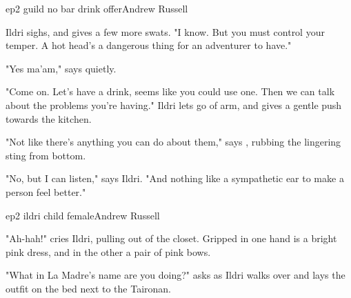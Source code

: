 \documentclass{book}
\begin{document}
\begin{childnode}{ep2 guild no bar drink offer}{Andrew Russell}


    Ildri sighs, and gives \name{} a few more swats. "I know. But you must control your temper. A hot head's a dangerous thing for an adventurer to have."

    "Yes ma'am," says \name{} quietly.

    "Come on. Let's have a drink, seems like you could use one. Then we can talk about the problems you're having." Ildri lets go of \names{} arm, and gives \himher{} a gentle push towards the kitchen. 

    "Not like there's anything you can do about them," says \name{}, rubbing the lingering sting from \hisher{} bottom.

    "No, but I can listen," says Ildri. "And nothing like a sympathetic ear to make a person feel better."



\end{childnode}

\begin{childnode}{ep2 ildri child female}{Andrew Russell}

    "Ah-hah!" cries Ildri, pulling out of the closet. Gripped in one hand is a bright pink dress, and in the other a pair of pink bows.

    "What in La Madre's name are you doing?" asks \name{} as Ildri walks over and lays the outfit on the bed next to the Taironan.



\end{childnode}
\end{document}
